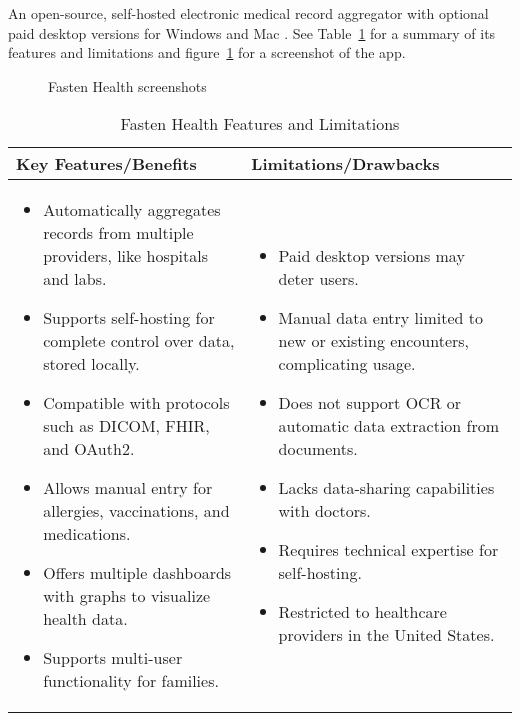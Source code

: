 An open-source, self-hosted electronic medical record aggregator with optional paid desktop versions for Windows and Mac \parencite{fasten}. See Table~\ref{tab:fasten_health} for a summary of its features and limitations and figure~\ref{fig:fasten} for a screenshot of the app.

\begin{figure}[ht]
    \centering
    \hspace{0.05\textwidth} 
    \caption{Fasten Health screenshots}\label{fig:fasten}
\end{figure}

\begin{table}[h!]
\centering
    \begin{tabular}{|p{}|p{}|}
    \hline
    \textbf{Key Features/Benefits} & \textbf{Limitations/Drawbacks} \\ \hline
    \begin{itemize}
        \item Automatically aggregates records from multiple providers, like hospitals and labs.
        \item Supports self-hosting for complete control over data, stored locally.
        \item Compatible with protocols such as DICOM, FHIR, and OAuth2.
        \item Allows manual entry for allergies, vaccinations, and medications.
        \item Offers multiple dashboards with graphs to visualize health data.
        \item Supports multi-user functionality for families.
    \end{itemize} &
    \begin{itemize}
        \item Paid desktop versions may deter users.
        \item Manual data entry limited to new or existing encounters, complicating usage.
        \item Does not support OCR or automatic data extraction from documents.
        \item Lacks data-sharing capabilities with doctors.
        \item Requires technical expertise for self-hosting.
        \item Restricted to healthcare providers in the United States.
    \end{itemize} \\ \hline
    \end{tabular}
\caption{Fasten Health Features and Limitations}\label{tab:fasten_health}
\end{table}
